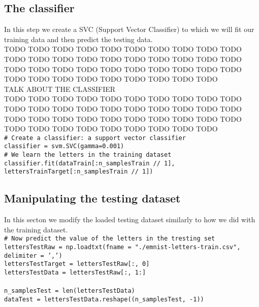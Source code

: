 \documentclass[a4paper,10pt]{report}
\newcommand{\code}[1]{\colorbox{light-gray}{\texttt{#1}}}
\begin{document}
 \subsection{The classifier}
 In this step we create a SVC (Support Vector Classifier) to which we will fit our training data and then predict the testing data.\\
 TODO TODO TODO TODO TODO TODO TODO TODO TODO TODO TODO TODO TODO TODO TODO TODO TODO TODO TODO TODO TODO TODO TODO TODO TODO TODO TODO TODO TODO TODO TODO TODO TODO TODO TODO TODO TODO TODO TODO\\
 TALK ABOUT THE CLASSIFIER\\
 TODO TODO TODO TODO TODO TODO TODO TODO TODO TODO TODO TODO TODO TODO TODO TODO TODO TODO TODO TODO TODO TODO TODO TODO TODO TODO TODO TODO TODO TODO TODO TODO TODO TODO TODO TODO TODO TODO TODO\\
 \code{\# Create a classifier: a support vector classifier}\\
 \code{classifier = svm.SVC(gamma=0.001)}\\
 \code{\# We learn the letters in the training dataset}\\
 \code{classifier.fit(dataTrain[:n\_samplesTrain // 1], lettersTrainTarget[:n\_samplesTrain // 1])}\\
 
 \subsection{Manipulating the testing dataset}
 In this secton we modify the loaded testing dataset similarly to how we did with the training dataset.\\
 
 \code{\# Now predict the value of the letters in the tresting set}\\
 \code{lettersTestRaw = np.loadtxt(fname = "./emnist-letters-train.csv", delimiter = ',')}\\
 \code{lettersTestTarget = lettersTestRaw[:, 0]}\\
 \code{lettersTestData = lettersTestRaw[:, 1:]}\\
 \code{}\\
 \code{n\_samplesTest = len(lettersTestData)}\\
 \code{dataTest = lettersTestData.reshape((n\_samplesTest, -1))}\\
\end{document}
